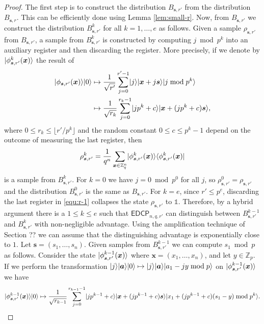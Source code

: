 \documentclass[11pt]{article}
\theoremstyle{plain}
\theoremstyle{definition}
\DeclarePairedDelimiter{\ldbrac}{\lvert}{\rangle}
\DeclarePairedDelimiter{\rdbrac}{\langle}{\rvert}
\def\Z{\ensuremath{\mathbb{Z}}}
\def\edcp{\ensuremath{\mathsf{EDCP}}}
\begin{document}
\begin{proof}
    The first step is to construct the distribution $B_{\bm{s}, r'}$ from the distribution $B_{\bm{s}, r}$. This can be efficiently done using Lemma \ref{lem:small-r}. Now, from $B_{\bm{s}, r'}$ we construct the distribution $B_{\bm{s}, r'}^k$ for all $k = 1, \dots, e$ as follows. Given a sample $\rho_{\bm{s}, r'}$ from $B_{\bm{s}, r'}$, a sample from $B_{\bm{s}, r'}^k$ is constructed by computing $j \bmod p^k$ into an auxiliary register and then discarding the register. More precisely, if we denote by  $\ldbrac{\phi_{\bm{s}, r'}^k(\bm{x})}$ the result of 
    \begin{align}
        \ldbrac{\phi_{\bm{s}, r'}(\bm{x})}\ldbrac{0}
        & \mapsto \frac{1}{\sqrt{r'}} \sum_{j = 0}^{r' - 1} \ldbrac{j}\ldbrac{\bm{x} + j\bm{s}}\ldbrac{j \bmod p^k} \label{equ:r-1}  \\
        & \mapsto \frac{1}{\sqrt{r_k}} \sum_{j = 0}^{r_k - 1} \ldbrac{jp^k + c}\ldbrac{\bm{x} + (jp^k + c)\bm{s}}, \nonumber
    \end{align}
    where $0 \le r_k \le \lfloor r' / p^k \rfloor$ and the random constant $0 \le c \le p^k - 1$ depend on the outcome of measuring the last register, then
    \[ \rho_{\bm{s}, r'}^k = \frac{1}{q^n} \sum_{\bm{x} \in \Z_q^n} \ldbrac{\phi_{\bm{s}, r'}^k(\bm{x})} \rdbrac{\phi_{\bm{s}, r'}^k(\bm{x})} \]
    is a sample from $B_{\bm{s}, r'}^k$. For $k = 0$ we have $j = 0 \bmod p^0$ for all $j$, so $\rho_{\bm{s}, r'}^0 = \rho_{\bm{s}, r'}$ and the distribution $B_{\bm{s}, r'}^0$ is the same as $B_{\bm{s}, r'}$. For $k = e$, since $r' \le p^e$, discarding the last register in \eqref{equ:r-1} collapses the state $\rho_{\bm{s}, r'}$ to $\mathds{1}$. Therefore, by a hybrid argument there is a $1 \le k \le e$ such that $\edcp_{n, q, r'}$ can distinguish between $B_{\bm{s}, r'}^{k - 1}$ and $B_{\bm{s}, r'}^k$ with non-negligible advantage. Using the amplification technique of Section ?? we can assume that the distinguishing advantage is exponentially close to $1$. Let $\bm{s} = (s_1, \dots, s_n)$. Given samples from $B_{\bm{s}, r'}^{k - 1}$ we can compute $s_1 \bmod p$ as follows. Consider the state $\ldbrac{\phi_{\bm{s}, r'}^{k - 1}(\bm{x})}$ where $\bm{x} = (x_1, \dots, x_n)$, and let $y \in \Z_p$. If we perform the transformation $\ldbrac{j}\ldbrac{\bm{a}}\ldbrac{0} \mapsto \ldbrac{j}\ldbrac{\bm{a}}\ldbrac{a_1 - jy \bmod p}$ on $\ldbrac{\phi_{\bm{s}, r'}^{k - 1}(\bm{x})}$ we have
    \[ \ldbrac{\phi_{\bm{s}, r'}^{k - 1}(\bm{x})}\ldbrac{0} \mapsto \frac{1}{\sqrt{r_{k - 1}}} \sum_{j = 0}^{r_{k - 1} - 1} \ldbrac{jp^{k - 1} + c}\ldbrac{\bm{x} + (jp^{k - 1} + c)\bm{s}}\ldbrac{x_1 + (jp^{k - 1} + c)(s_1 - y) \bmod p^k}. \]

\end{proof}
\end{document}
